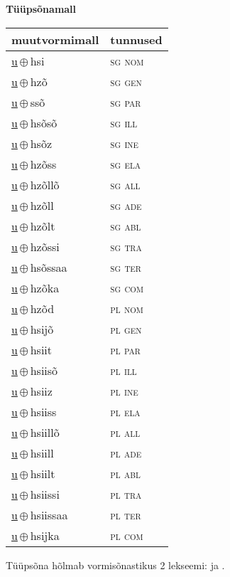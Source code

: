 

\vspace{3.5em}
\noindent \begin{minipage}{\textwidth}
\noindent \textbf{Tüüpsõnamall \,}\\

\begin{sideways}
\begin{tabular}{l l}
muutvormimall & tunnused \\
\hline
\underline{u}\,$\oplus$\,hsi & \textsc{ sg nom } \\
\underline{u}\,$\oplus$\,hzõ & \textsc{ sg gen } \\
\underline{u}\,$\oplus$\,ssõ & \textsc{ sg par } \\
\underline{u}\,$\oplus$\,hsõsõ & \textsc{ sg ill } \\
\underline{u}\,$\oplus$\,hsõz & \textsc{ sg ine } \\
\underline{u}\,$\oplus$\,hzõss & \textsc{ sg ela } \\
\underline{u}\,$\oplus$\,hzõllõ & \textsc{ sg all } \\
\underline{u}\,$\oplus$\,hzõll & \textsc{ sg ade } \\
\underline{u}\,$\oplus$\,hzõlt & \textsc{ sg abl } \\
\underline{u}\,$\oplus$\,hzõssi & \textsc{ sg tra } \\
\underline{u}\,$\oplus$\,hsõssaa & \textsc{ sg ter } \\
\underline{u}\,$\oplus$\,hzõka & \textsc{ sg com } \\
\underline{u}\,$\oplus$\,hzõd & \textsc{ pl nom } \\
\underline{u}\,$\oplus$\,hsijõ & \textsc{ pl gen } \\
\underline{u}\,$\oplus$\,hsiit & \textsc{ pl par } \\
\underline{u}\,$\oplus$\,hsiisõ & \textsc{ pl ill } \\
\underline{u}\,$\oplus$\,hsiiz & \textsc{ pl ine } \\
\underline{u}\,$\oplus$\,hsiiss & \textsc{ pl ela } \\
\underline{u}\,$\oplus$\,hsiillõ & \textsc{ pl all } \\
\underline{u}\,$\oplus$\,hsiill & \textsc{ pl ade } \\
\underline{u}\,$\oplus$\,hsiilt & \textsc{ pl abl } \\
\underline{u}\,$\oplus$\,hsiissi & \textsc{ pl tra } \\
\underline{u}\,$\oplus$\,hsiissaa & \textsc{ pl ter } \\
\underline{u}\,$\oplus$\,hsijka & \textsc{ pl com } \\
\end{tabular}
\end{sideways}
\label{tab:tüüpsõnamall-uhsi}

\end{minipage}

 
\vspace{1em}
\noindent Tüüpsõna hõlmab vormisõnastikus 2 lekseemi:  ja .
